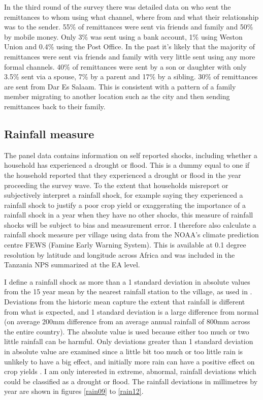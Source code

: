 In the third round of the survey there was detailed data on who sent the remittances to whom using what channel, where from and what their relationship was to the sender. 55\% of remittances were sent via friends and family and 50\% by mobile money. Only 3\% was sent using a bank account, 1\% using Weston Union and 0.4\% using the Post Office. In the past it's likely that the majority of remittances were sent via friends and family with very little sent using any more formal channels. 40\% of remittances were sent by a son or daughter with only 3.5\% sent via a spouse, 7\% by a parent and 17\% by a sibling. 30\% of remittances are sent from Dar Es Salaam. This is consistent with a pattern of a family member migrating to another location such as the city and then sending remittances back to their family. 


\subsection{Rainfall measure}
The panel data contains information on self reported shocks, including whether a household has experienced a drought or flood. This is a dummy equal to one if the household reported that they experienced a drought or flood in the year proceeding the survey wave. To the extent that households misreport or subjectively interpret a rainfall shock, for example saying they experienced a rainfall shock to justify a poor crop yield or exaggerating the importance of a rainfall shock in a year when they have no other shocks, this measure of rainfall shocks will be subject to bias and measurement error. I therefore also calculate a rainfall shock measure per village using data from the NOAA's climate prediction centre FEWS (Famine Early Warning System). This is available at 0.1 degree resolution by latitude and longitude across Africa and was included in the Tanzania NPS summarized at the EA level. 

I define a rainfall shock as more than a 1 standard deviation in absolute values from the 15 year mean by the nearest rainfall station to the village, as used in \cite{jensen2000}.  Deviations from the historic mean capture the extent that rainfall is different from what is expected, and 1 standard deviation is a large difference from normal (on average 200mm difference from an average annual rainfall of 800mm across the entire country). The absolute value is used because either too much or two little rainfall can be harmful. Only deviations greater than 1 standard deviation in absolute value are examined since a little bit too much or too little rain is unlikely to have a big effect, and initially more rain can have a positive effect on crop yields \cite{paxson1992using}. I am only interested in extreme, abnormal, rainfall deviations which could be classified as a drought or flood. The rainfall deviations in millimetres by year are shown in figures \ref{rain09} to \ref{rain12}.    

